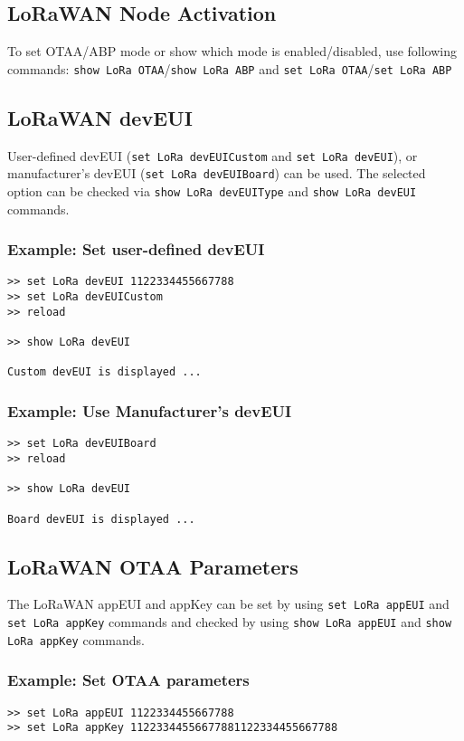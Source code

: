 \subsection{LoRaWAN Node Activation}
To set OTAA/ABP mode or show which mode is enabled/disabled, use following commands: {\tt show LoRa OTAA}/{\tt show LoRa ABP} and {\tt set LoRa OTAA}/{\tt set LoRa ABP}

\subsection{LoRaWAN devEUI}
User-defined devEUI ({\tt set LoRa devEUICustom} and {\tt set LoRa devEUI}), or manufacturer's devEUI ({\tt set LoRa devEUIBoard}) can be used. The selected option can be checked via {\tt show LoRa devEUIType} and {\tt show LoRa devEUI} commands.

\subsubsection*{Example: Set user-defined devEUI}
\begin{Verbatim}[frame=single, fontsize=\small]
>> set LoRa devEUI 1122334455667788
>> set LoRa devEUICustom
>> reload

>> show LoRa devEUI

Custom devEUI is displayed ...

\end{Verbatim}

\subsubsection*{Example: Use Manufacturer's devEUI}
\begin{Verbatim}[frame=single, fontsize=\small]
>> set LoRa devEUIBoard
>> reload

>> show LoRa devEUI

Board devEUI is displayed ...
\end{Verbatim}

\subsection{LoRaWAN OTAA Parameters}
The LoRaWAN appEUI and appKey can be set by using {\tt set LoRa appEUI} and {\tt set LoRa appKey} commands and checked by using {\tt show LoRa appEUI} and {\tt show LoRa appKey} commands.
  
\subsubsection*{Example: Set OTAA parameters}
\begin{Verbatim}[frame=single, fontsize=\small]
>> set LoRa appEUI 1122334455667788
>> set LoRa appKey 11223344556677881122334455667788
\end{Verbatim}
  

